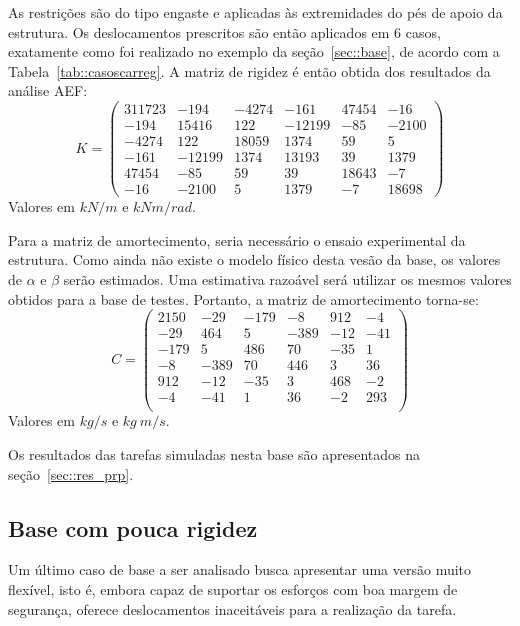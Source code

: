 As restrições são do tipo engaste e aplicadas às extremidades do pés de apoio da
estrutura. Os deslocamentos prescritos são então aplicados em 6 casos,
exatamente como foi realizado no exemplo da seção~\ref{sec::base}, de acordo com a
Tabela~\ref{tab::casoscarreg}. A matriz de rigidez é então obtida dos resultados
da análise AEF:
%
\begin{equation}
	K = 
\begin{pmatrix}
311723	&	-194	&	-4274	&	-161	&	47454	&	-16 \\
-194	&	15416	&	122	&	-12199	&	-85	&	-2100 \\
-4274	&	122	&	18059	&	1374	&	59	&	5 \\
-161	&	-12199	&	1374	&	13193	&	39	&	1379 \\
47454	&	-85	&	59	&	39	&	18643	&	-7 \\
-16	&	-2100	&	5	&	1379	&	-7	&	18698
\end{pmatrix}
\end{equation}
%
Valores em $kN/m$ e $kNm/rad$.

Para a matriz de amortecimento, seria necessário o ensaio experimental da
estrutura. Como ainda não existe o modelo físico desta vesão da base, os valores
de $\alpha$ e $\beta$ serão estimados. Uma estimativa razoável será utilizar os
mesmos valores obtidos para a base de testes. Portanto, a matriz de
amortecimento torna-se:
%
\begin{equation}
	C = 
\begin{pmatrix}
2150	&	-29	&	-179	&	-8	&	912	&	-4 \\
-29	&	464	&	5	&	-389	&	-12	&	-41 \\
-179	&	5	&	486	&	70	&	-35	&	1 \\
-8	&	-389	&	70	&	446	&	3	&	36 \\
912	&	-12	&	-35	&	3	&	468	&	-2 \\
-4	&	-41	&	1	&	36	&	-2	&	293 \\
\end{pmatrix}
\end{equation}
%
Valores em $kg/s$ e $kg~m/s$. 

Os resultados das tarefas simuladas nesta base são apresentados na
seção~\ref{sec::res_prp}.



\subsection{Base com pouca rigidez}

Um último caso de base a ser analisado busca apresentar uma versão muito
flexível, isto é, embora capaz de suportar os esforços com boa margem de
segurança, oferece deslocamentos inaceitáveis para a realização da tarefa.


